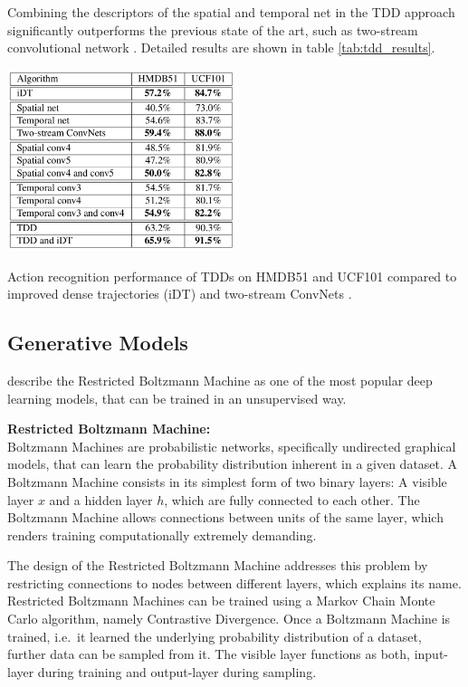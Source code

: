 Combining the descriptors of the spatial and temporal net in the TDD approach significantly outperforms the previous state of the art, such as two-stream convolutional network \cite{simonyan_two-stream_2014}.
Detailed results are shown in table \ref{tab:tdd_results}.

\begin{table}[H]
    \centering
    \includegraphics[width=0.5\textwidth]{img_deep/tdd_results}
    \caption{Action recognition performance of TDDs on HMDB51 and UCF101 compared to improved dense trajectories (iDT) \cite{wang_action_2013} and two-stream ConvNets \cite{simonyan_two-stream_2014}. \cite{wang_action_2015}}
    \label{tab:tdd_results}
\end{table}


\subsection{Generative Models}
\label{sec:generative}
\textcite{palasek_action_2016} describe the Restricted Boltzmann Machine as one of the most popular deep learning models, that can be trained in an unsupervised way.

\textbf{Restricted Boltzmann Machine:}\\
Boltzmann Machines \cite{ackley_learning_1985} are probabilistic networks, specifically undirected graphical models, that can learn the probability distribution inherent in a given dataset.
A Boltzmann Machine consists in its simplest form of two binary layers: A visible layer $x$ and a hidden layer $h$, which are fully connected to each other.
The Boltzmann Machine allows connections between units of the same layer, which renders training computationally extremely demanding.

The design of the Restricted Boltzmann Machine \cite{hinton_fast_2006} addresses this problem by restricting connections to nodes between different layers, which explains its name.
Restricted Boltzmann Machines can be trained using a Markov Chain Monte Carlo algorithm, namely Contrastive Divergence.
Once a Boltzmann Machine is trained, i.e.\ it learned the underlying probability distribution of a dataset, further data can be sampled from it.
The visible layer functions as both, input-layer during training and output-layer during sampling.

